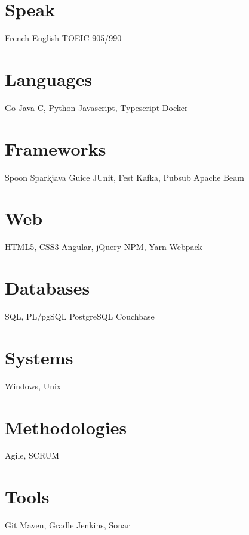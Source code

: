 \documentclass[hidelinks]{cv-style}          %
\begin{document}
\poste{}

\begin{aside}
\section{Speak}
French
English
TOEIC 905/990
%
\section{Languages}
Go
Java
C, Python
Javascript, Typescript
Docker
\section{Frameworks}
Spoon
Sparkjava
Guice
JUnit, Fest
Kafka, Pubsub
Apache Beam
\section{Web}
HTML5, CSS3
Angular, jQuery
NPM, Yarn
Webpack
\section{Databases}
SQL, PL/pgSQL
PostgreSQL
Couchbase 
\section{Systems}
Windows, Unix	
\section{Methodologies}
Agile, SCRUM
\section{Tools}
Git
Maven, Gradle
Jenkins, Sonar
%
\end{aside}






\end{document}
